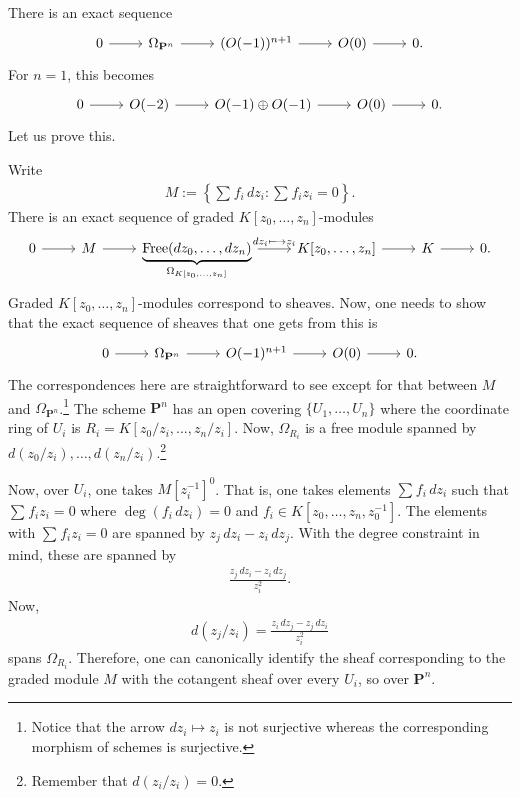 \documentclass [11 pt, oneside] {article}
\begin{document}
\begin{example}[ ]\label{}\text{}
There is an exact sequence
\[
\begin{tikzcd}
	0\ar[r] & \Omega_{\mathbf{P}^n} \ar[r] & (\mathscr{O}(-1)) ^{n+1} \ar[r]& \mathscr{O}(0)\ar[r] &0. 
\end{tikzcd}
\]
For $n=1$, this becomes
\[
\begin{tikzcd}
	0\ar[r]& \mathscr{O}(-2)\ar[r]&  \mathscr{O}(-1) \oplus \mathscr{O}(-1) \ar[r] &  \mathscr{O}(0)\ar[r] &0.
\end{tikzcd}
\]
Let us prove this.

Write
\begin{align*}
	M := \left\{ \sum_{}^{} f_i\, dz_i: \sum_{}^{} f_iz_i = 0 \right\}.
\end{align*}
There is an exact sequence of graded $K[z_0,\hdots, z_n]$-modules
\[
\begin{tikzcd}
	0\ar[r] & M \ar[r] & \displaystyle\underbrace{\Free(dz_0,\hdots, dz_n) }_{\Omega_{K[z_0,\hdots, z_n]}} \ar[r, "dz_i\longmapsto z_i"] & K[z_0,\hdots, z_n] \ar[r] & K \ar[r] &0.
\end{tikzcd}
\]
Graded $K[z_0,\hdots, z_n]$-modules correspond to sheaves. Now, one needs to show that the exact sequence of sheaves that one gets from this is
\[
\begin{tikzcd}
	0\ar[r]&\Omega_{\mathbf{P}^n} \ar[r] & \mathscr{O}(-1)^{n+1} \ar[r]&  \mathscr{O}(0) \ar[r] &0.
\end{tikzcd}
\]
The correspondences here are straightforward to see except for that between $M$ and $\Omega_{\mathbf{P}^n}$.\footnote{Notice that the arrow $dz_i\longmapsto z_i$ is not surjective whereas the corresponding morphism of schemes is surjective.}
The scheme $\mathbf{P}^n$ has an open covering $\{U_1,\hdots, U_n\}$ where the coordinate ring of $U_i$ is $R_i = K[z_0/z_i,\hdots, z_n/z_i]$. 
Now, $\Omega_{R_i}$ is a free module spanned by $d(z_0/z_i),\hdots, d(z_n/z_i)$.\footnote{Remember that $d(z_i/z_i)=0$.} 

Now, over $U_i$, one takes $M[z_i^{-1}]^0$. That is, one takes elements $\sum_{}^{} f_i\, dz_i$ such that $\sum_{}^{} f_iz_i=0$ where $\deg (f_i\,dz_i)=0$ and $f_i \in K[z_0,\hdots, z_n,z_0^{-1}]$.
The elements with $\sum_{}^{} f_iz_i=0$ are spanned by $z_j\,dz_i - z_i\,dz_j$.
With the degree constraint in mind, these are spanned by
\begin{align*}
	\frac{z_j\,dz_i - z_i\,dz_j}{z_i^2}.
\end{align*}
Now, 
\begin{align*}
	d(z_j/z_i) =  \frac{z_i\,dz_j - z_j\,dz_i}{z_i^2}
\end{align*}
spans $\Omega_{R_i}$. 
Therefore, one can canonically identify the sheaf corresponding to the graded module $M$ with the cotangent sheaf over every $U_i$, so over $\mathbf{P}^n$.
\end{example}
\end{document}
